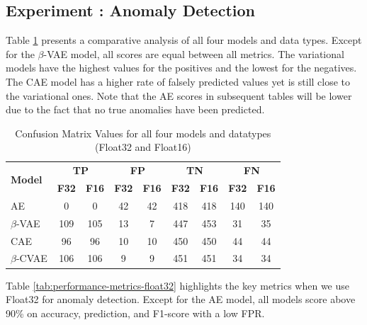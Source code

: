 \subsection{Experiment : Anomaly Detection}

Table \ref{tab:confusion-matrix-results} presents a comparative analysis of all four models and data types. Except for the $\beta$-VAE model, all scores are equal between all metrics. The variational models have the highest values for the positives and the lowest for the negatives. The CAE model has a higher rate of falsely predicted values yet is still close to the variational ones. Note that the AE scores in subsequent tables will be lower due to the fact that no true anomalies have been predicted.

\begin{table}[!htbp]
\centering
\begin{tabular}{l cccccccc}
\toprule
\multirow{2}{*}{\textbf{Model}} & \multicolumn{2}{c}{\textbf{TP}} & \multicolumn{2}{c}{\textbf{FP}} & \multicolumn{2}{c}{\textbf{TN}} & \multicolumn{2}{c}{\textbf{FN}} \\
\cmidrule(lr){2-3} \cmidrule(lr){4-5} \cmidrule(lr){6-7} \cmidrule(lr){8-9}
& \textbf{F32} & \textbf{F16} & \textbf{F32} & \textbf{F16} & \textbf{F32} & \textbf{F16} & \textbf{F32} & \textbf{F16} \\
\midrule
\rowcolor{gray!10} AE   & 0 & 0 & 42 & 42 & 418 & 418 & 140 & 140 \\
$\beta$-VAE  & 109 & 105 & 13 & 7 & 447 & 453 & 31 & 35 \\
\rowcolor{gray!10} CAE  & 96 & 96 & 10 & 10 & 450 & 450 & 44 & 44 \\
$\beta$-CVAE & 106 & 106 & 9 & 9 & 451 & 451 & 34 & 34 \\
\bottomrule
\end{tabular}
\caption{Confusion Matrix Values for all four models and datatypes (Float32 and Float16)}
\label{tab:confusion-matrix-results}
\end{table}

Table \ref{tab:performance-metrics-float32} highlights the key metrics when we use Float32 for anomaly detection. Except for the AE model, all models score above 90\% on accuracy, prediction, and F1-score with a low FPR.


